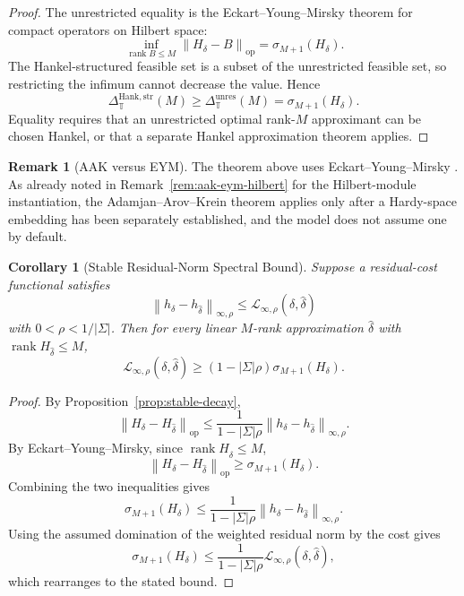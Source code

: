 \documentclass[12pt]{article}
\newtheorem{corollary}[theorem]{Corollary}
\theoremstyle{definition}
\newtheorem{remark}[theorem]{Remark}
\newcommand{\norm}[1]{\left\lVert#1\right\rVert}
\begin{document}
\begin{proof}
The unrestricted equality is the Eckart--Young--Mirsky theorem for compact
operators on Hilbert space:
\[
\inf_{\operatorname{rank}B\le M}
\norm{H_\delta-B}_{\mathrm{op}}
=
\sigma_{M+1}(H_\delta).
\]
The Hankel-structured feasible set is a subset of the unrestricted feasible
set, so restricting the infimum cannot decrease the value.  Hence
\[
\Delta_{\mathbb T}^{\mathrm{Hank,str}}(M)
\ge
\Delta_{\mathbb T}^{\mathrm{unres}}(M)
=
\sigma_{M+1}(H_\delta).
\]
Equality requires that an unrestricted optimal rank-$M$ approximant can be
chosen Hankel, or that a separate Hankel approximation theorem applies.
\end{proof}

\begin{remark}[AAK versus EYM]
\label{rem:aak-eym-meta}
The theorem above uses Eckart--Young--Mirsky \cite{eckart1936,mirsky1960}.  As
already noted in Remark~\ref{rem:aak-eym-hilbert} for the Hilbert-module
instantiation, the Adamjan--Arov--Krein theorem \cite{aak1971} applies only
after a Hardy-space embedding has been separately established, and the model
does not assume one by default.
\end{remark}

\begin{corollary}[Stable Residual-Norm Spectral Bound]
\label{cor:stable-residual-spectral}
Suppose a residual-cost functional satisfies
\[
\norm{h_\delta-h_{\widehat\delta}}_{\infty,\rho}
\le
\mathcal L_{\infty,\rho}(\delta,\widehat\delta)
\]
with $0<\rho<1/|\Sigma|$.  Then for every linear $M$-rank approximation
$\widehat\delta$ with $\operatorname{rank}H_{\widehat\delta}\le M$,
\[
\mathcal L_{\infty,\rho}(\delta,\widehat\delta)
\ge
(1-|\Sigma|\rho)
\sigma_{M+1}(H_\delta).
\]
\end{corollary}

\begin{proof}
By Proposition~\ref{prop:stable-decay},
\[
\norm{H_\delta-H_{\widehat\delta}}_{\mathrm{op}}
\le
\frac{1}{1-|\Sigma|\rho}
\norm{h_\delta-h_{\widehat\delta}}_{\infty,\rho}.
\]
By Eckart--Young--Mirsky, since
$\operatorname{rank}H_{\widehat\delta}\le M$,
\[
\norm{H_\delta-H_{\widehat\delta}}_{\mathrm{op}}
\ge
\sigma_{M+1}(H_\delta).
\]
Combining the two inequalities gives
\[
\sigma_{M+1}(H_\delta)
\le
\frac{1}{1-|\Sigma|\rho}
\norm{h_\delta-h_{\widehat\delta}}_{\infty,\rho}.
\]
Using the assumed domination of the weighted residual norm by the cost gives
\[
\sigma_{M+1}(H_\delta)
\le
\frac{1}{1-|\Sigma|\rho}
\mathcal L_{\infty,\rho}(\delta,\widehat\delta),
\]
which rearranges to the stated bound.
\end{proof}
\end{document}
